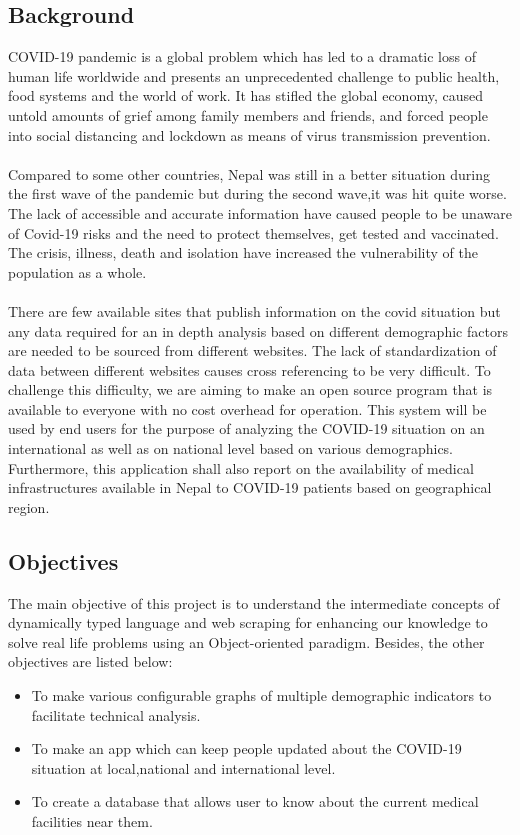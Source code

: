 \documentclass{article}
\begin{document}
\subsection{Background}
COVID-19 pandemic is a global problem which has led to a dramatic loss of human life worldwide and presents an unprecedented challenge to public health, food systems and the world of work. It has stifled the global economy, caused untold amounts of grief among family members and friends, and forced people into social 
distancing and lockdown as means of virus transmission prevention. 
\\\\
Compared to some other countries, Nepal was still in a better situation during the first wave of the pandemic but during the second wave,it was hit quite worse. The lack of accessible and accurate information have caused people to be unaware of Covid-19 risks and the need to protect themselves, get tested and vaccinated. The crisis, illness, death and isolation have increased the vulnerability of the population as a whole.
\\\\
There are few available sites that publish information on the covid situation but any data required for an in depth analysis based on different demographic factors 
are needed to be sourced from different websites. The lack of standardization of data between different websites causes cross referencing to be very difficult. To 
challenge this difficulty, we are aiming to make an open source program that is available to everyone with no cost overhead for operation. This system will be used 
by end users for the purpose of analyzing the COVID-19 situation on an international as well as on national level based on various demographics. Furthermore, this application shall also report on the availability of medical infrastructures available in Nepal to COVID-19 patients based on geographical region.

\vspace*{5mm}
\subsection{Objectives}
The main objective of this project is to understand the intermediate concepts of dynamically typed language and web scraping for enhancing our knowledge to solve 
real life problems using an Object-oriented paradigm. Besides, the other objectives are listed below:
\begin{itemize}
    \item To make various configurable graphs of multiple demographic indicators to facilitate technical analysis.
    \item To make an app which can keep people updated about the COVID-19 situation at local,national and international level. 
    \item To create a database that allows user to know about the current medical facilities near them.     
\end{itemize}
\end{document}
